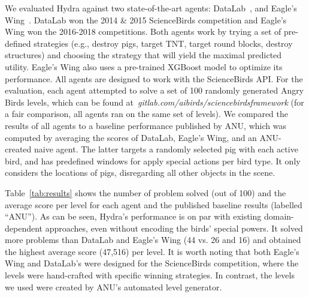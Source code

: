 \documentclass[letterpaper]{article} %
\begin{document}
We evaluated Hydra against two state-of-the-art agents: 
DataLab~\cite{borovicka2014datalab}, and
Eagle's Wing~\cite{wang2017description}. 
DataLab won the 2014 \& 2015 ScienceBirds competition and Eagle's Wing won the 2016-2018 competitions. 
Both agents work by trying a set of pre-defined strategies (e.g., destroy pigs, target TNT, target round blocks, destroy structures) and choosing the strategy that will yield the maximal predicted utility. 
Eagle's Wing also uses a pre-trained XGBoost model to optimize its performance. %
All agents are designed to work with the ScienceBirds API. For the evaluation, each agent attempted to solve a set of 100 randomly generated Angry Birds levels, which can be found at~\emph{gitlab.com/aibirds/sciencebirdsframework} (for a fair comparison, all agents ran on the same set of levels). 
We compared the results of all agents to a baseline performance published by ANU, which was computed by averaging the scores of 
DataLab, 
Eagle's Wing, 
and an ANU-created naive agent. 
The latter targets a randomly selected pig with each active bird, and has predefined windows for apply special actions per bird type. It only considers the locations of pigs, disregarding all other objects in the scene.




Table~\ref{tab:results} shows the number of problem solved (out of 100) and the average score per level for each agent and the published baseline results (labelled ``ANU''). 
As can be seen, Hydra's performance is on par with existing domain-dependent approaches, even without encoding the birds' special powers. It solved more problems than DataLab and Eagle's Wing (44 vs. 26 and 16) and obtained the highest average score (47,516) per level. 
It is worth noting that both Eagle's Wing and DataLab's were designed for the ScienceBirds competition, where the levels were hand-crafted with specific winning strategies. In contrast, the levels we used were created by ANU's automated level generator.
\end{document}
